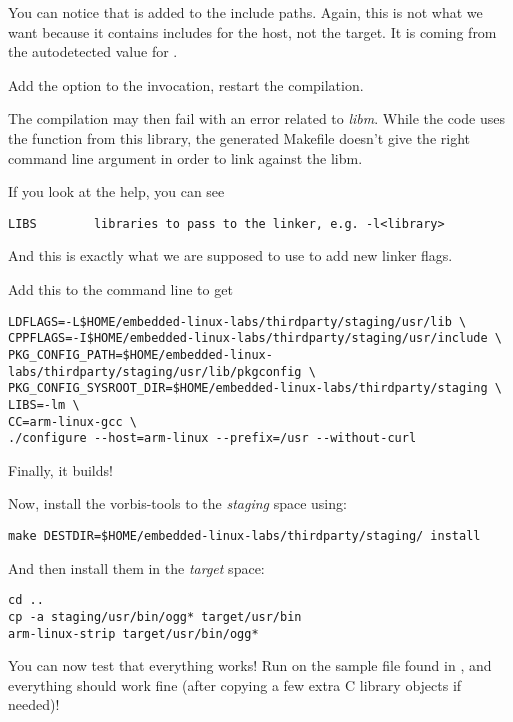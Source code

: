 You can notice that  is added to the include paths.
Again, this is not what we want because it contains includes for the
host, not the target. It is coming from the autodetected value for
.

Add the  option to the  invocation,
restart the compilation.

The compilation may then fail with an error related to {\em libm}. While
the code uses the function from this library, the generated Makefile
doesn't give the right command line argument in order to link against
the libm.

If you look at the  help, you can see
\begin{verbatim}
LIBS        libraries to pass to the linker, e.g. -l<library>
\end{verbatim}

And this is exactly what we are supposed to use to add new linker
flags.

Add this to the  command line to get
\begin{verbatim}
LDFLAGS=-L$HOME/embedded-linux-labs/thirdparty/staging/usr/lib \
CPPFLAGS=-I$HOME/embedded-linux-labs/thirdparty/staging/usr/include \
PKG_CONFIG_PATH=$HOME/embedded-linux-labs/thirdparty/staging/usr/lib/pkgconfig \
PKG_CONFIG_SYSROOT_DIR=$HOME/embedded-linux-labs/thirdparty/staging \
LIBS=-lm \
CC=arm-linux-gcc \
./configure --host=arm-linux --prefix=/usr --without-curl
\end{verbatim}

Finally, it builds!

Now, install the vorbis-tools to the {\em staging} space using:

\begin{verbatim}
make DESTDIR=$HOME/embedded-linux-labs/thirdparty/staging/ install
\end{verbatim}

And then install them in the {\em target} space:

\begin{verbatim}
cd ..
cp -a staging/usr/bin/ogg* target/usr/bin
arm-linux-strip target/usr/bin/ogg*
\end{verbatim}

You can now test that everything works! Run  on the
sample file found in , and everything should
work fine (after copying a few extra C library objects if needed)!
